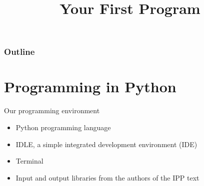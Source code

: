 \documentclass[8pt,a4paper,compress]{beamer}
\title{Your First Program}
\date{}
\begin{document}
\begin{frame}
\vfill
\titlepage
\end{frame}

\begin{frame}
\frametitle{Outline}
\tableofcontents
\end{frame}

\section{Programming in Python}
\begin{frame}[fragile]
\pause

\begin{minipage}{200pt}
Our programming environment
\begin{itemize}
\item Python programming language  
\item IDLE, a simple integrated development environment (IDE)
\item Terminal
\item Input and output libraries from the authors of the IPP text \end{itemize}
\end{minipage}%
\begin{minipage}{100pt}
\begin{center}


\end{center}
\end{minipage}
\end{frame}
\end{document}
